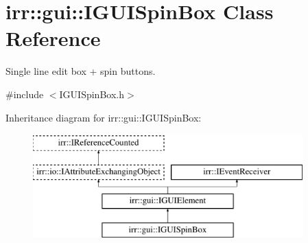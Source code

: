 \hypertarget{classirr_1_1gui_1_1IGUISpinBox}{}\section{irr\+:\+:gui\+:\+:I\+G\+U\+I\+Spin\+Box Class Reference}
\label{classirr_1_1gui_1_1IGUISpinBox}


Single line edit box + spin buttons.  




{\ttfamily \#include $<$I\+G\+U\+I\+Spin\+Box.\+h$>$}

Inheritance diagram for irr\+:\+:gui\+:\+:I\+G\+U\+I\+Spin\+Box\+:\begin{figure}[H]
\begin{center}
\leavevmode
\includegraphics[height=4.000000cm]{classirr_1_1gui_1_1IGUISpinBox}
\end{center}
\end{figure}
